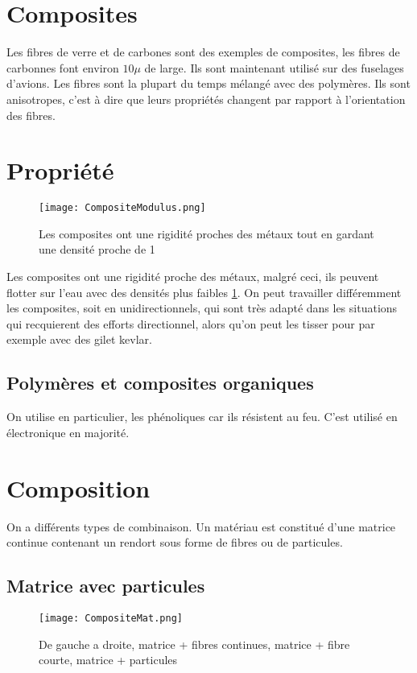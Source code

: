 \documentclass[../main.tex]{subfiles}
\begin{document}
	\section{Composites}
	Les fibres de verre et de carbones sont des exemples de composites, les fibres de carbonnes font environ $10\mu$ de large. Ils sont maintenant utilisé sur des fuselages d'avions. Les fibres sont la plupart du temps mélangé avec des polymères. Ils sont anisotropes, c'est à dire que leurs propriétés changent par rapport à l'orientation des fibres.
	\section{Propriété}
	\begin{figure}
		\begin{center}
			\texttt{[image: CompositeModulus.png]}
			\caption{\label{compositemodulus}Les composites ont une rigidité proches des métaux tout en gardant une densité proche de 1}
		\end{center}
	\end{figure}
	Les composites ont une rigidité proche des métaux, malgré ceci, ils peuvent flotter sur l'eau avec des densités plus faibles \ref{compositemodulus}. On peut travailler différemment les composites, soit en unidirectionnels, qui sont très adapté dans les situations qui recquierent des efforts directionnel, alors qu'on peut les tisser pour par exemple avec des gilet kevlar.
	\subsection{Polymères et composites organiques}
	On utilise en particulier, les phénoliques car ils résistent au feu. C'est utilisé en électronique en majorité. 
	\section{Composition}
	On a différents types de combinaison. Un matériau est constitué d'une matrice continue contenant un rendort sous forme de fibres ou de particules. 
	\subsection{Matrice avec particules}
	\begin{figure}
		\begin{center}
			\texttt{[image: CompositeMat.png]}
			\caption{\label{compositemat}De gauche a droite, matrice + fibres continues, matrice + fibre courte, matrice + particules}
		\end{center}
	\end{figure}
	
\end{document}
